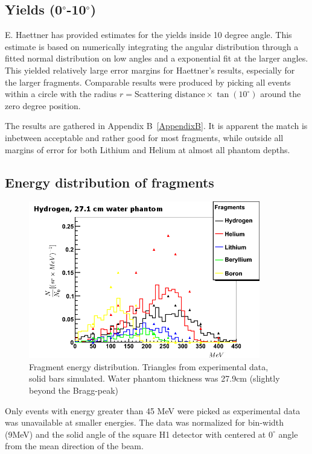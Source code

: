 \subsection{Yields (0$^\circ$-10$^\circ$)}
E. Haettner has provided estimates for the yields inside 10 degree angle. This estimate is based on numerically integrating the angular distribution through a fitted normal distribution on low angles and a exponential fit at the larger angles. This yielded relatively large error margins for Haettner's results, especially for the larger fragments. Comparable results were produced by picking all events within a circle with the radius $r = \text{Scattering distance} \times \tan(10^{\circ})$ around the zero degree position.

The results are gathered in Appendix B~\ref{AppendixB}. It is apparent the match is inbetween acceptable and rather good for most fragments, while outside all margins of error for both Lithium and Helium at almost all phantom depths.



\subsection{Energy distribution of fragments}
\begin{figure}[h] 
\begin{center}
\includegraphics[width=0.9\textwidth]{images/fragmentEnergyDistr.png}  
\caption{\label{fig:fragmentEnergyDistr} Fragment energy distribution. Triangles from experimental data, solid bars simulated. Water phantom thickness was 27.9cm (slightly beyond the Bragg-peak)}
\end{center}
\end{figure}
Only events with energy greater than 45 MeV were picked as experimental data was unavailable at smaller energies. The data was normalized for bin-width (9MeV) and the solid angle of the square H1 detector with centered at $0^{\circ}$ angle from the mean direction of the beam.

